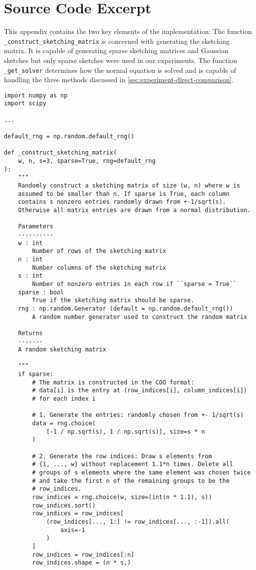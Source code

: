 \chapter{Source Code Excerpt}

This appendix contains the two key elements of the implementation:
The function \texttt{_construct_sketching_matrix} is concerned with generating the sketching matrix.
It is capable of generating sparse sketching matrices and Gaussian sketches but only sparse sketches were used in our experiments.
The function \texttt{_get_solver} determines how the normal equation is solved and is capable of handling the three methods discussed in \cref{sec:experiment-direct-comparison}.

\begin{verbatim}
import numpy as np
import scipy

...

default_rng = np.random.default_rng()

def _construct_sketching_matrix(
    w, n, s=3, sparse=True, rng=default_rng
):
    """
    Randomly construct a sketching matrix of size (w, n) where w is
    assumed to be smaller than n. If sparse is True, each column
    contains s nonzero entries randomly drawn from +-1/sqrt(s).
    Otherwise all matrix entries are drawn from a normal distribution.

    Parameters
    ----------
    w : int
        Number of rows of the sketching matrix
    n : int
        Number columns of the sketching matrix
    s : int
        Number of nonzero entries in each row if ``sparse = True``
    sparse : bool
        True if the sketching matrix should be sparse.
    rng : np.random.Generator (default = np.random.default_rng())
        A random number generator used to construct the random matrix

    Returns
    -------
    A random sketching matrix

    """
    if sparse:
        # The matrix is constructed in the COO format:
        # data[i] is the entry at (row_indices[i], column_indices[i])
        # for each index i

        # 1. Generate the entries: randomly chosen from +- 1/sqrt(s)
        data = rng.choice(
            [-1 / np.sqrt(s), 1 / np.sqrt(s)], size=s * n
        )

        # 2. Generate the row indices: Draw s elements from
        # {1, ..., w} without replacement 1.1*n times. Delete all
        # groups of s elements where the same element was chosen twice
        # and take the first n of the remaining groups to be the
        # row_indices.
        row_indices = rng.choice(w, size=(int(n * 1.1), s))
        row_indices.sort()
        row_indices = row_indices[
            (row_indices[..., 1:] != row_indices[..., :-1]).all(
                axis=-1
            )
        ]
        row_indices = row_indices[:n]
        row_indices.shape = (n * s,)


\end{verbatim}
